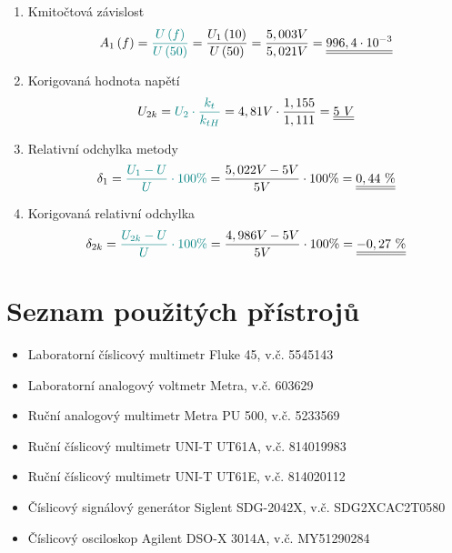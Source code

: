 \documentclass[a4paper, czech]{article}
\begin{document}
\begin{enumerate}
    \item Kmitočtová závislost
    \begin{multline*}
        A_1 \left(f\right) = \textcolor{teal}{\frac{U \left(f\right)}{U \left(50\right)}} = \frac{U_1 \left(10\right)}{U \left(50\right)} = \frac{5,003V}{5,021V} = \underline{\underline{996,4 \cdot 10^{-3}}} \hfill
    \end{multline*}
    \item Korigovaná hodnota napětí
    \begin{multline*}
        U_{2k} = \textcolor{teal}{U_2 \cdot \frac{k_t}{k_{tH}}} = 4,81V \cdot \frac{1,155}{1,111} = \underline{\underline{5\ V}} \hfill
    \end{multline*}
    \item Relativní odchylka metody
    \begin{multline*}
        \delta_1 = \textcolor{teal}{\frac{U_1 - U}{U} \cdot 100\%} = \frac{5,022V - 5V}{5V} \cdot 100 \% = \underline{\underline{0,44\ \%}} \hfill
    \end{multline*}
    \item Korigovaná relativní odchylka
    \begin{multline*}
        \delta_{2k} = \textcolor{teal}{\frac{U_{2k} - U}{U} \cdot 100\%} = \frac{4,986 V - 5V}{5V} \cdot 100 \% = \underline{\underline{-0,27\ \%}} \hfill
    \end{multline*}
\end{enumerate}

\section{Seznam použitých přístrojů}

\begin{itemize}
    \item Laboratorní číslicový multimetr Fluke 45, v.č. 5545143
    \item Laboratorní analogový voltmetr Metra, v.č. 603629
    \item Ruční analogový multimetr Metra PU 500, v.č. 5233569
    \item Ruční číslicový multimetr UNI-T UT61A, v.č. 814019983
    \item Ruční číslicový multimetr UNI-T UT61E, v.č. 814020112
    \item Číslicový signálový generátor Siglent SDG-2042X, v.č. SDG2XCAC2T0580
    \item Číslicový osciloskop Agilent DSO-X 3014A, v.č. MY51290284
\end{itemize}
\end{document}
